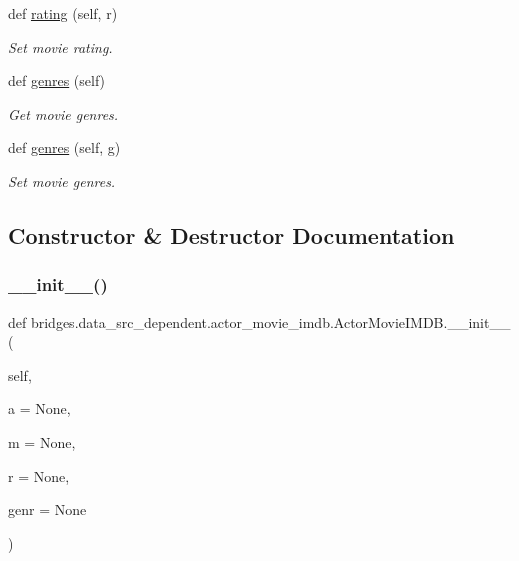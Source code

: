 \begin{DoxyCompactItemize}
def \hyperlink{classbridges_1_1data__src__dependent_1_1actor__movie__imdb_1_1_actor_movie_i_m_d_b_a72585e9e7ad9d2d2409cbd4f6fb92fcc}{rating} (self, r)
\begin{DoxyCompactList}\small\item\em Set movie rating. \end{DoxyCompactList}\item 
def \hyperlink{classbridges_1_1data__src__dependent_1_1actor__movie__imdb_1_1_actor_movie_i_m_d_b_acc623b92939fcbb3aac641e10f2ef8cf}{genres} (self)
\begin{DoxyCompactList}\small\item\em Get movie genres. \end{DoxyCompactList}\item 
def \hyperlink{classbridges_1_1data__src__dependent_1_1actor__movie__imdb_1_1_actor_movie_i_m_d_b_a4bfb9e981d78ab19a8a385897dc77cd3}{genres} (self, g)
\begin{DoxyCompactList}\small\item\em Set movie genres. \end{DoxyCompactList}\end{DoxyCompactItemize}


\subsection{Constructor \& Destructor Documentation}
\mbox{\label{classbridges_1_1data__src__dependent_1_1actor__movie__imdb_1_1_actor_movie_i_m_d_b_add733f3ecfc9282d102cee6bf5e20674}} 
\subsubsection{\texorpdfstring{\+\_\+\+\_\+init\+\_\+\+\_\+()}{\_\_init\_\_()}}
{\footnotesize\ttfamily def bridges.\+data\+\_\+src\+\_\+dependent.\+actor\+\_\+movie\+\_\+imdb.\+Actor\+Movie\+I\+M\+D\+B.\+\_\+\+\_\+init\+\_\+\+\_\+ (\begin{DoxyParamCaption}\item[{}]{self,  }\item[{}]{a = {\ttfamily None},  }\item[{}]{m = {\ttfamily None},  }\item[{}]{r = {\ttfamily None},  }\item[{}]{genr = {\ttfamily None} }\end{DoxyParamCaption})}



